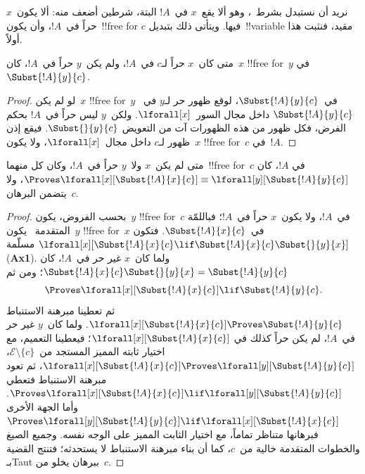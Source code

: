 \documentclass[../../../include/open-logic-section]{subfiles}
\begin{document}
\begin{explain}
نريد أن نستبدل بشرط~، وهو ألا يقع~$x$ في~$!A$
البتة، شرطين أضعف منه: ألا يكون~$x$ حراً في~$!A$، وأن يكون~!!{free for}
$c$ فيها. ويتأتى ذلك بتبديل~!!{variable} مقيد، فنثبت هذا أولاً.
\end{explain}

\begin{lem}
متى كان~$x$ حراً لـ$c$ في~$!A$، ولم يكن~$y$ حراً في~$!A$، كان~$x$
!!{free for}~$y$ في~$\Subst{!A}{y}{c}$.
\end{lem}

\begin{proof}
لو لم يكن~$x$ !!{free for}~$y$ في~$\Subst{!A}{y}{c}$، لوقع ظهور حر
لـ$y$ في~$\Subst{!A}{y}{c}$ داخل مجال السور~$\lforall[x]$. ولكن~$y$
ليس حراً في~$!A$ بحكم الفرض، فكل ظهور من هذه الظهورات آت من التعويض
$\Subst{}{y}{c}$. فيقع إذن ظهور لـ$c$ داخل مجال~$\lforall[x]$، ولا
يكون~$x$ !!{free for}~$c$ في~$!A$.
\end{proof}

\begin{lem}
متى لم يكن~$x$ ولا~$y$ حراً في~$!A$، وكان كل منهما~!!{free for}~$c$ في
$!A$، كان
$\Proves \lforall[x][\Subst{!A}{x}{c}] \equiv
\lforall[y][\Subst{!A}{y}{c}]$، ولا يتضمن البرهان~$c$.
\end{lem}

\begin{proof}
بحسب الفروض، يكون~$y$ !!{free for}~$c$ في~$!A$، ولا يكون~$x$ حراً
في~$!A$؛ فباللمّة المتقدمة~ يكون~$y$
!!{free for}~$x$ في~$\Subst{!A}{x}{c}$. فتكون
$\lforall[x][\Subst{!A}{x}{c} \lif
\Subst{!A}{x}{c} \Subst{}{y}{x}]$ مسلّمة (\textbf{Ax1}). ولما كان~$x$
غير حر في~$!A$، كان
$\Subst{!A}{x}{c} \Subst{}{y}{x} = \Subst{!A}{y}{c}$؛ ومن ثم
\[
\Proves \lforall[x][\Subst{!A}{x}{c}] \lif \Subst{!A}{y}{c}.
\]
ثم تعطينا مبرهنة الاستنباط
$\lforall[x][\Subst{!A}{x}{c}] \Proves \Subst{!A}{y}{c}$. ولما كان~$y$
غير حر في~$!A$، لم يكن حراً كذلك في
$\lforall[x][\Subst{!A}{x}{c}]$؛ فيعطينا التعميم، مع اختيار ثابته
المميز المستجد من~$\mathcal E\setminus\{c\}$،
$\lforall[x][\Subst{!A}{x}{c}] \Proves
\lforall[y][\Subst{!A}{y}{c}]$، ثم تعود مبرهنة الاستنباط فتعطي
$\Proves \lforall[x][\Subst{!A}{x}{c}] \lif
\lforall[y][\Subst{!A}{y}{c}]$. وأما الجهة الأخرى
$\Proves \lforall[y][\Subst{!A}{y}{c}] \lif
\lforall[x][\Subst{!A}{x}{c}]$ فبرهانها متناظر تماماً، مع اختيار الثابت
المميز على الوجه نفسه. وجميع الصيغ والخطوات المتقدمة خالية من~$c$، كما أن
بناء مبرهنة الاستنباط لا يستحدثه؛ فتنتج القضية بـTaut ببرهان يخلو من~$c$.
\end{proof}
\end{document}
